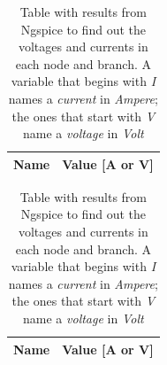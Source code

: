 \begin{table}
    \parbox{.45\linewidth}{
        \centering
        \begin{tabular}{|c|c|}
            \hline
            {\bf Name} & {\bf Value [A or V]} \\ \hline
            
        \end{tabular}
        \label{tab:GainStage_AC}
        \caption{Results of Nodal Analysis of the circuit for t < 0. A variable that begins  with \textit{I} names a \textit{current} in \textit{Ampere}; the ones that start with \textit{V} name a \textit{voltage} in \textit{Volt}}
    }
    \hfill
    \parbox{.45\linewidth}{
        \centering
        \begin{tabular}{|c|c|}
            {\bf Name} & {\bf Value [A or V]} \\ \hline
            
            \hline
        \end{tabular}
        \label{tab:GainStage_OP}
        \caption{Table with results from Ngspice to find out the voltages and currents in each node and branch. A variable that begins  with \textit{I} names a \textit{current} in \textit{Ampere}; the ones that start with \textit{V} name a \textit{voltage} in \textit{Volt} }
    }
\end{table}



